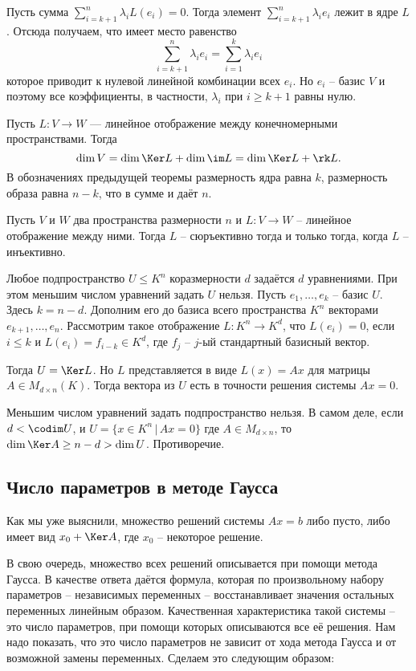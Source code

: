 Пусть сумма $\sum_{i=k+1}^n \lambda_i L(e_i)=0$. Тогда элемент $\sum_{i=k+1}^n \lambda_i e_i $ лежит в ядре $L$. Отсюда получаем, что имеет место равенство $$\sum_{i=k+1}^n \lambda_ie_i = \sum_{i=1}^k \lambda_i e_i$$
которое приводит к нулевой линейной комбинации всех $e_i$. Но $e_i$ -- базис $V$ и поэтому все коэффициенты, в частности, $\lambda_i$ при $i\geq k+1$ равны нулю.
\endproof

\crl Пусть $L\colon V \to W$ --- линейное отображение между конечномерными пространствами. Тогда
$$\dim V= \dim \Ker L +  \dim \im L= \dim \Ker L +\rk L.$$
\ecrl
\proof В обозначениях предыдущей теоремы размерность ядра равна $k$, размерность образа равна $n-k$, что в сумме и даёт $n$.
\endproof



 Пусть $V$ и $W$ два пространства размерности $n$ и $L \colon V \to W$ -- линейное отображение между ними. Тогда $L$ -- сюръективно тогда и только тогда, когда $L$ -- инъективно.
\ecrl

\thrm Любое подпространство $U\leq K^n$ коразмерности $d$ задаётся $d$ уравнениями. При этом меньшим числом уравнений задать $U$ нельзя. 
\ethrm
\proof 
Пусть $e_1,\dots,e_k$ -- базис $U$. Здесь $k=n-d$. Дополним его до базиса всего пространства $K^n$ векторами $e_{k+1},\dots,e_n$. Рассмотрим такое отображение $L\colon K^n \to K^d$, что $L(e_i)=0$, если $i\leq k$ и $L(e_i)=f_{i-k} \in K^d$, где $f_j$ -- $j$-ый стандартный базисный вектор.

Тогда $U=\Ker L$. Но $L$ представляется в виде $L(x)=Ax$ для матрицы $A\in M_{d\times n}(K)$. Тогда вектора из $U$ есть в точности решения системы $Ax=0$. 
\endproof

\rm Меньшим числом уравнений задать подпространство нельзя. В самом деле, если $d<\codim U$, и $U=\{ x\in K^n\,|\, Ax=0\}$ где $A\in M_{d\times n}$, то $\dim \Ker A\geq n- d > \dim U$. Противоречие.
\erm


\subsection{Число параметров в методе Гаусса}

Как мы уже выяснили, множество решений системы $Ax=b$ либо пусто, либо имеет вид $x_0 + \Ker A$, где $x_0$ -- некоторое решение.

В свою очередь, множество всех решений описывается при помощи метода Гаусса. В качестве ответа даётся формула, которая по произвольному набору параметров -- независимых переменных -- восстанавливает значения остальных переменных линейным образом. Качественная характеристика такой системы -- это число параметров, при помощи которых описываются все её решения. Нам надо показать, что это число параметров не зависит от хода метода Гаусса и от возможной замены переменных. Сделаем это следующим образом:

